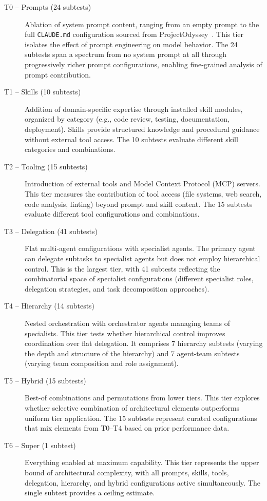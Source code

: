 \documentclass[11pt]{article}
\begin{document}
\begin{description}
  \item[T0 -- Prompts (24 subtests)] Ablation of system prompt content, ranging
    from an empty prompt to the full \texttt{CLAUDE.md} configuration sourced
    from ProjectOdyssey~\cite{projectodyssey}. This
    tier isolates the effect of prompt engineering on model behavior. The 24
    subtests span a spectrum from no system prompt at all through progressively
    richer prompt configurations, enabling fine-grained analysis of prompt
    contribution.
  \item[T1 -- Skills (10 subtests)] Addition of domain-specific expertise
    through installed skill modules, organized by category (e.g., code review,
    testing, documentation, deployment). Skills provide structured knowledge
    and procedural guidance without external tool access. The 10 subtests
    evaluate different skill categories and combinations.
  \item[T2 -- Tooling (15 subtests)] Introduction of external tools and Model
    Context Protocol (MCP) servers. This tier measures the contribution of tool
    access (file systems, web search, code analysis, linting) beyond prompt and
    skill content. The 15 subtests evaluate different tool configurations and
    combinations.
  \item[T3 -- Delegation (41 subtests)] Flat multi-agent configurations with
    specialist agents. The primary agent can delegate subtasks to specialist
    agents but does not employ hierarchical control. This is the largest tier,
    with 41 subtests reflecting the combinatorial space of specialist
    configurations (different specialist roles, delegation strategies, and
    task decomposition approaches).
  \item[T4 -- Hierarchy (14 subtests)] Nested orchestration with orchestrator
    agents managing teams of specialists. This tier tests whether hierarchical
    control improves coordination over flat delegation. It comprises 7
    hierarchy subtests (varying the depth and structure of the hierarchy) and
    7 agent-team subtests (varying team composition and role assignment).
  \item[T5 -- Hybrid (15 subtests)] Best-of combinations and permutations from
    lower tiers. This tier explores whether selective combination of
    architectural elements outperforms uniform tier application. The 15
    subtests represent curated configurations that mix elements from T0--T4
    based on prior performance data.
  \item[T6 -- Super (1 subtest)] Everything enabled at maximum capability. This
    tier represents the upper bound of architectural complexity, with all
    prompts, skills, tools, delegation, hierarchy, and hybrid configurations
    active simultaneously. The single subtest provides a ceiling estimate.
\end{description}
\end{document}
